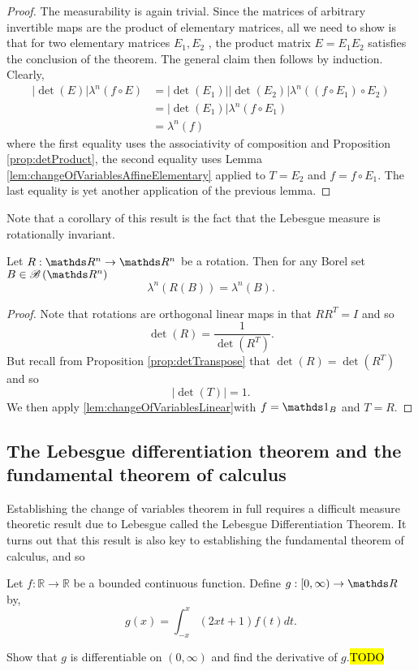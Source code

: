 \begin{proof}
The measurability is again trivial. Since the matrices of arbitrary
invertible maps are the product of elementary matrices, all we need
to show is that for two elementary matrices $E_{1},E_{2}$ , the product
matrix $E=E_{1}E_{2}$ satisfies the conclusion of the theorem. The
general claim then follows by induction. Clearly, 
\begin{align*}
\lvert\det\left(E\right)\rvert\lambda^{n}\left(f\circ E\right) & =\lvert\det\left(E_{1}\right)\rvert\lvert\det\left(E_{2}\right)\rvert\lambda^{n}\left(\left(f\circ E_{1}\right)\circ E_{2}\right)\\
 & =\lvert\det\left(E_{1}\right)\rvert\lambda^{n}\left(f\circ E_{1}\right)\\
 & =\lambda^{n}\left(f\right)
\end{align*}
where the first equality uses the associativity of composition and
Proposition \ref{prop:detProduct}, the second equality uses Lemma
\ref{lem:changeOfVariablesAffineElementary} applied to $T=E_{2}$
and $f=f\circ E_{1}$. The last equality is yet another application
of the previous lemma.
\end{proof}
Note that a corollary of this result is the fact that the Lebesgue
measure is rotationally invariant.
\begin{cor}
\label{cor:lebesgueRotationalInvariance}Let $R:\R^{n}\to\R^{n}$
be a rotation. Then for any Borel set $B\in\borel\left(\R^{n}\right)$
\[
\lambda^{n}\left(R\left(B\right)\right)=\lambda^{n}\left(B\right).
\]
\end{cor}

\begin{proof}
Note that rotations are orthogonal linear maps in that $RR^{T}=I$
and so 
\[
\det\left(R\right)=\frac{1}{\det\left(R^{T}\right)}.
\]
But recall from Proposition \ref{prop:detTranspose} that $\det\left(R\right)=\det\left(R^{T}\right)$
and so
\[
\lvert\det\left(T\right)\rvert=1.
\]
We then apply \ref{lem:changeOfVariablesLinear}with $f=\indicate_{B}$
and $T=R$.
\end{proof}

\subsection{The Lebesgue differentiation theorem and the fundamental theorem
of calculus}

Establishing the change of variables theorem in full requires a difficult
measure theoretic result due to Lebesgue called the Lebesgue Differentiation
Theorem. It turns out that this result is also key to establishing
the fundamental theorem of calculus, and so
\begin{example}
\label{exa:isi2007samplepsb4}Let $f:\mathbb{R}\rightarrow\mathbb{R}$
be a bounded continuous function. Define $g:[0,\infty)\rightarrow\R$
by, 
\[
g(x)=\int_{-x}^{x}(2xt+1)f(t)dt.
\]

Show that $g$ is differentiable on $(0,\infty)$ and find the derivative
of $g$.\hl{TODO}
\end{example}


